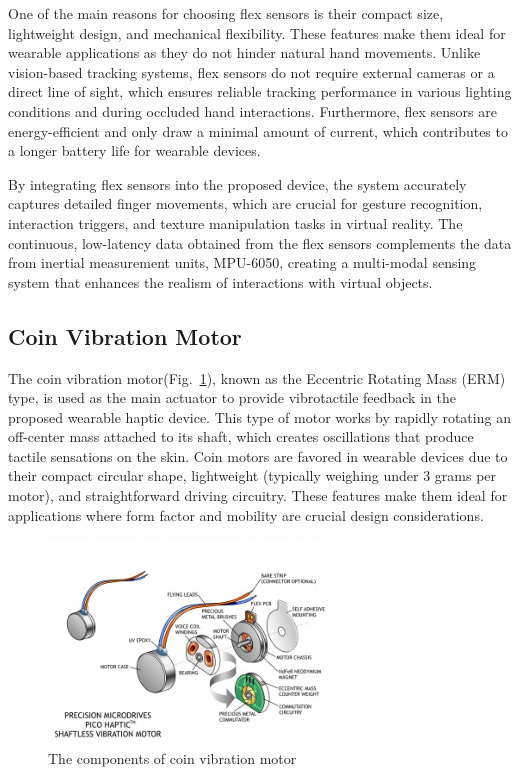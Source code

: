 One of the main reasons for choosing flex sensors is their compact size, lightweight design, and mechanical flexibility. These features make them ideal for wearable applications as they do not hinder natural hand movements. Unlike vision-based tracking systems, flex sensors do not require external cameras or a direct line of sight, which ensures reliable tracking performance in various lighting conditions and during occluded hand interactions. Furthermore, flex sensors are energy-efficient and only draw a minimal amount of current, which contributes to a longer battery life for wearable devices.

By integrating flex sensors into the proposed device, the system accurately captures detailed finger movements, which are crucial for gesture recognition, interaction triggers, and texture manipulation tasks in virtual reality. The continuous, low-latency data obtained from the flex sensors complements the data from inertial measurement units, MPU-6050, creating a multi-modal sensing system that enhances the realism of interactions with virtual objects.

\newpage
\subsection{Coin Vibration Motor}
The coin vibration motor(Fig.~\ref{fig:coin_motor}), known as the Eccentric Rotating Mass (ERM) type, is used as the main actuator to provide vibrotactile feedback in the proposed wearable haptic device. This type of motor works by rapidly rotating an off-center mass attached to its shaft, which creates oscillations that produce tactile sensations on the skin. Coin motors are favored in wearable devices due to their compact circular shape, lightweight (typically weighing under 3 grams per motor), and straightforward driving circuitry. These features make them ideal for applications where form factor and mobility are crucial design considerations\cite{coin_motor}.

\begin{figure}[H]\centering
	\includegraphics[width=0.7\textwidth]{Pictures/coin_motor.jpg}%
	\caption{The components of coin vibration motor\cite{coin_motor}}\label{fig:coin_motor}%
\end{figure}


